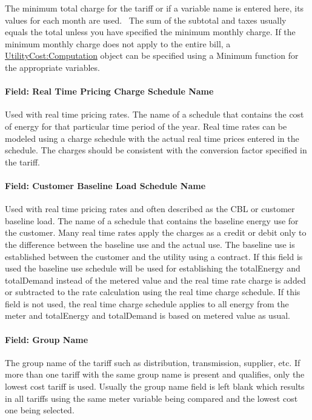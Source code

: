 The minimum total charge for the tariff or if a variable name is entered here, its values for each month are used.~ The sum of the subtotal and taxes usually equals the total unless you have specified the minimum monthly charge. If the minimum monthly charge does not apply to the entire bill, a \hyperref[utilitycostcomputation]{UtilityCost:Computation} object can be specified using a Minimum function for the appropriate variables.

\paragraph{Field: Real Time Pricing Charge Schedule Name}\label{field-real-time-pricing-charge-schedule-name}

Used with real time pricing rates. The name of a schedule that contains the cost of energy for that particular time period of the year. Real time rates can be modeled using a charge schedule with the actual real time prices entered in the schedule. The charges should be consistent with the conversion factor specified in the tariff.

\paragraph{Field: Customer Baseline Load Schedule Name}\label{field-customer-baseline-load-schedule-name}

Used with real time pricing rates and often described as the CBL or customer baseline load. The name of a schedule that contains the baseline energy use for the customer. Many real time rates apply the charges as a credit or debit only to the difference between the baseline use and the actual use. The baseline use is established between the customer and the utility using a contract. If this field is used the baseline use schedule will be used for establishing the totalEnergy and totalDemand instead of the metered value and the real time rate charge is added or subtracted to the rate calculation using the real time charge schedule. If this field is not used, the real time charge schedule applies to all energy from the meter and totalEnergy and totalDemand is based on metered value as usual.

\paragraph{Field: Group Name}\label{field-group-name}

The group name of the tariff such as distribution, transmission, supplier, etc. If more than one tariff with the same group name is present and qualifies, only the lowest cost tariff is used. Usually the group name field is left blank which results in all tariffs using the same meter variable being compared and the lowest cost one being selected.

